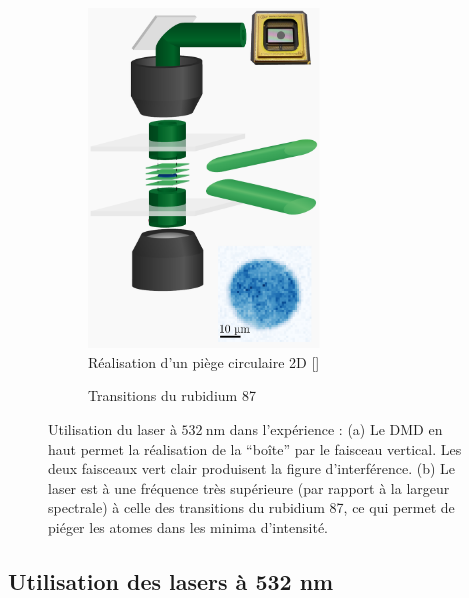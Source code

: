 \documentclass[11pt,a4paper]{article}
\newcommand{\ncite}[1]{[\citenum{#1}]}
\newcommand{\lmbd}[1]{$\SI{#1}{\nano\metre}$}
\begin{document}
\begin{figure}[htbp] 
	\centering
	\begin{subfigure}[b]{0.48\textwidth}
    	\centering
    	\small
	\includegraphics[height=9cm]{img/accordeon-dmd.pdf}
	\caption{Réalisation d'un piège circulaire 2D \ncite{ville}}
		\label{fig:accordeon}
	\end{subfigure}	
	\begin{subfigure}[b]{0.48\textwidth}
		\centering
   	
		\caption{Transitions du rubidium 87}
		\label{fig:transitions}
	\end{subfigure}

	\caption{Utilisation du laser à \lmbd{532} dans l'expérience : \small (a) Le DMD en haut permet la réalisation de la ``boîte'' par le faisceau vertical. Les deux faisceaux vert clair produisent la figure d'interférence. (b)  Le laser est à une fréquence très supérieure (par rapport à la largeur spectrale) à celle des transitions du rubidium 87, ce qui permet de piéger les atomes dans les minima d'intensité.}
\end{figure}



\subsection{Utilisation des lasers à 532 nm}
\end{document}
